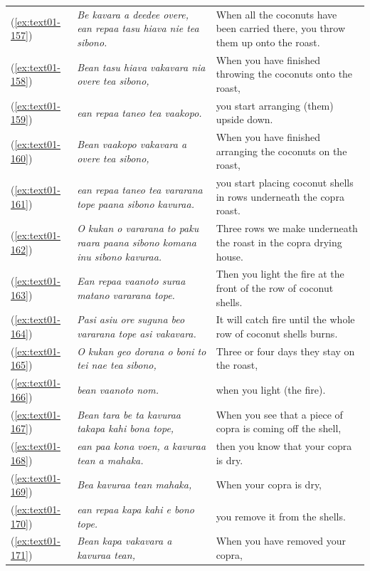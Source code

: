 \documentclass[output=paper]{langscibook}
\begin{document}
\begin{xltabular}{\textwidth}{lXX}
    (\ref{ex:text01-157})&\textit{Be kavara a deedee overe, ean repaa tasu hiava nie tea sibono.}&When all the coconuts have been carried there, you throw them up onto the roast.\\
    (\ref{ex:text01-158})&\textit{Bean tasu hiava vakavara nia overe tea sibono,}&When you have finished throwing the coconuts onto the roast,\\
    (\ref{ex:text01-159})&\textit{ean repaa taneo tea vaakopo.}&you start arranging (them) upside down.\\
    (\ref{ex:text01-160})&\textit{Bean vaakopo vakavara a overe tea sibono,}&When you have finished arranging the coconuts on the roast,\\
    (\ref{ex:text01-161})&\textit{ean repaa taneo tea vararana tope paana sibono kavuraa.}&you start placing coconut shells in rows underneath the copra roast.\\
    (\ref{ex:text01-162})&\textit{O kukan o vararana to paku raara paana sibono komana inu sibono kavuraa.}&Three rows we make underneath the roast in the copra drying house.\\
    (\ref{ex:text01-163})&\textit{Ean repaa vaanoto suraa matano vararana tope.}&Then you light the fire at the front of the row of coconut shells.\\
    (\ref{ex:text01-164})&\textit{Pasi asiu ore suguna beo vararana tope asi vakavara.}&It will catch fire until the whole row of coconut shells burns.\\
    (\ref{ex:text01-165})&\textit{O kukan geo dorana o boni to tei nae tea sibono,}&Three or four days they stay on the roast,\\
    (\ref{ex:text01-166})&\textit{bean vaanoto nom.}&when you light (the fire).\\
    (\ref{ex:text01-167})&\textit{Bean tara be ta kavuraa takapa kahi bona tope,}&When you see that a piece of copra is coming off the shell,\\
    (\ref{ex:text01-168})&\textit{ean paa kona voen, a kavuraa tean a mahaka.}&then you know that your copra is dry.\\
    (\ref{ex:text01-169})&\textit{Bea kavuraa tean mahaka,}&When your copra is dry,\\
    (\ref{ex:text01-170})&\textit{ean repaa kapa kahi e bono tope.}&you remove it from the shells.\\
    (\ref{ex:text01-171})&\textit{Bean kapa vakavara a kavuraa tean,}&When you have removed your copra,\\

\end{xltabular}
\end{document}
